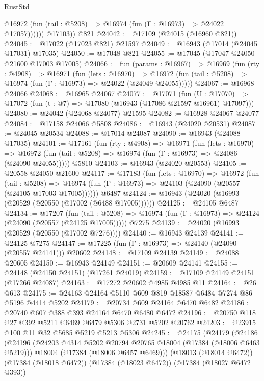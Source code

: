 \begin{lexlean}{RustStd}
\begin{coremodule}
              @16972 (fun (tail : @5208) => @16974 (fun (Γ : @16973) => @24022 @17057))))))
        @17103))
    @821
@24042 := @17109 (@24015 (@16960 @821))
@24045 := @17022 (@17023 @821) @21597
@24049 := @16943 (@17014 (@24045 @17031) @17035)
@24050 := @17048 @821
@24055 := @17045 (@17047 @24050 @21600 @17003 @17005)
@24066 := fun (params : @16967) =>
  @16969
    (fun (rty : @4908) =>
    @16971
      (fun (lets : @16970) =>
      @16972 (fun (tail : @5208) => @16974 (fun (Γ : @16973) => @24022 (@24049 @24055)))))
@24067 := @16968 @24066
@24068 := @16965 @24067
@24077 := @17071
    (fun (U : @17070) => @17072 (fun (t : @7) => @17080 (@16943 (@17086 @21597 @16961) @17097)))
@24080 := @24042 (@24068 @24077) @21595
@24082 := @16928 @24067 @24077
@24084 := @17158 @24066 @5808
@24086 := @16943 (@24020 @20531)
@24087 := @24045 @20534
@24088 := @17014 @24087
@24090 := @16943 (@24088 @17035)
@24101 := @17161
    (fun (rty : @4908) =>
    @16971
      (fun (lets : @16970) =>
      @16972 (fun (tail : @5208) => @16974 (fun (Γ : @16973) => @24086 (@24090 @24055)))))
    @5810
@24103 := @16943 (@24020 @20553)
@24105 := @20558 @24050 @21600
@24117 := @17183
    (fun (lets : @16970) =>
    @16972
      (fun (tail : @5208) =>
      @16974 (fun (Γ : @16973) => @24103 (@24090 (@20557 (@24105 @17003 @17005))))))
    @6487
@24124 := @16943 (@24020 (@16993 (@20529 (@20550 (@17002 (@6488 @17005))))))
@24125 := @24105 @6487
@24134 := @17207
    (fun (tail : @5208) => @16974 (fun (Γ : @16973) => @24124 (@24090 (@20557 (@24125 @17005)))))
    @7275
@24139 := @24020 (@16993 (@20529 (@20550 (@17002 @7276))))
@24140 := @16943 @24139
@24141 := @24125 @7275
@24147 := @17225 (fun (Γ : @16973) => @24140 (@24090 (@20557 @24141))) @20602
@24148 := @17109 @24139
@24149 := @24088 @20605
@24150 := @16943 @24149
@24151 := @20609 @24141
@24155 := @24148 (@24150 @24151) (@17261 @24019)
@24159 := @17109 @24149 @24151 (@17266 @24087)
@24163 := @17272 @20602 @4985 @4985 @11
@24164 := @26 @613
@24175 := @24163 @24164 @5110 @609 @819 @18587 @6484 @7274 @86 @5196 @4414 @5202
@24179 := @20734 @609 @24164 @6470 @6482
@24186 := @20740 @607 @388 @393 @24164 @6470 @6480 @6472
@24196 := @20750 @118 @27 @392 @5211 @6469 @6479 @5306 @2731 @5202 @20762
@24203 := @23915 @100 @11 @32 @5685 @5219 @5213 @5306
@24245 := @24175
    (@24179
      (@24186
        (@24196
          (@24203 @4314 @5202 @20794 @20765 @18004 (@17384 (@18006 @6463 @5219)))
          @18004
          (@17384 (@18006 @6457 @6469)))
        (@18013 (@18014 @6472))
        (@17384 (@18018 @6472))
        (@17384 (@18023 @6472))
        (@17384 (@18027 @6472 @393))

\end{coremodule}
\end{lexlean}
